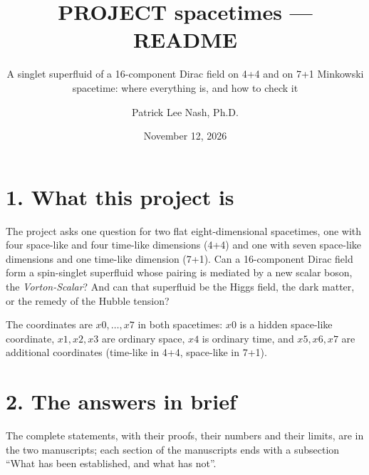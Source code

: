 \documentclass[
  10pt,
]{article}
\title{PROJECT spacetimes --- README}
\subtitle{A singlet superfluid of a 16-component Dirac field on 4+4 and
on 7+1 Minkowski spacetime: where everything is, and how to check it}
\author{Patrick Lee Nash, Ph.D.}
\date{November 12, 2026}
\begin{document}
\maketitle

\hypertarget{what-this-project-is}{%
\section{1. What this project is}\label{what-this-project-is}}

The project asks one question for two flat eight-dimensional spacetimes,
one with four space-like and four time-like dimensions (4+4) and one
with seven space-like dimensions and one time-like dimension (7+1). Can
a 16-component Dirac field form a spin-singlet superfluid whose pairing
is mediated by a new scalar boson, the \emph{Vorton-Scalar}? And can
that superfluid be the Higgs field, the dark matter, or the remedy of
the Hubble tension?

The coordinates are \(x0,\dots,x7\) in both spacetimes: \(x0\) is a
hidden space-like coordinate, \(x1,x2,x3\) are ordinary space, \(x4\) is
ordinary time, and \(x5,x6,x7\) are additional coordinates (time-like in
4+4, space-like in 7+1).

\hypertarget{the-answers-in-brief}{%
\section{2. The answers in brief}\label{the-answers-in-brief}}

The complete statements, with their proofs, their numbers and their
limits, are in the two manuscripts; each section of the manuscripts ends
with a subsection ``What has been established, and what has not''.
\end{document}
